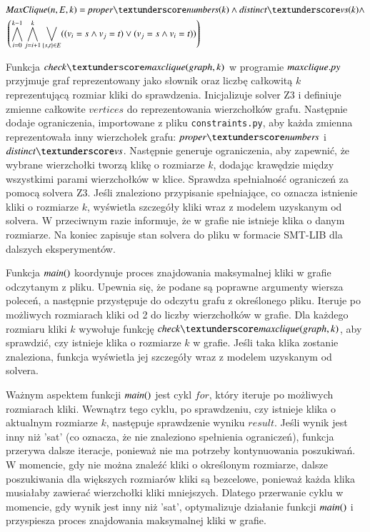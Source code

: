 \begin{align*}
	&\MaxClique(n, E, k) = \propernumbers(k)  \land \distinctvs(k)  \land \\
	&\left( \bigwedge_{i=0}^{k-1} \bigwedge_{j=i+1}^{k} \bigvee_{\{s,t\} \in E} ((v_i = s \land v_j = t) \lor (v_j = s \land v_i = t)) \right)	
\end{align*}

Funkcja $\checkclique$  w programie ${\mathit{maxclique.py}}$ przyjmuje graf reprezentowany jako słownik oraz liczbę całkowitą $k$ reprezentującą rozmiar kliki do sprawdzenia. Inicjalizuje solver Z3 i definiuje zmienne całkowite $vertices$ do reprezentowania wierzchołków grafu. Następnie dodaje ograniczenia, importowane z pliku \texttt{constraints.py}, aby każda zmienna reprezentowała inny wierzchołek grafu: $\propernumbers$ i $\distinctvs$. Następnie generuje ograniczenia, aby zapewnić, że wybrane wierzchołki tworzą klikę o rozmiarze $k$, dodając krawędzie między wszystkimi parami wierzchołków w klice. Sprawdza spełnialność ograniczeń za pomocą solvera Z3. Jeśli znaleziono przypisanie spełniające, co oznacza istnienie kliki o rozmiarze $k$, wyświetla szczegóły kliki wraz z modelem uzyskanym od solvera. W przeciwnym razie informuje, że w grafie nie istnieje klika o danym rozmiarze. Na koniec zapisuje stan solvera do pliku w formacie SMT-LIB dla dalszych eksperymentów.



Funkcja ${\mathit{main()}}$ koordynuje proces znajdowania maksymalnej kliki w grafie odczytanym z pliku. Upewnia się, że podane są poprawne argumenty wiersza poleceń, a następnie przystępuje do odczytu grafu z określonego pliku. Iteruje po możliwych rozmiarach kliki od 2 do liczby wierzchołków w grafie. Dla każdego rozmiaru kliki $k$ wywołuje funkcję $\checkclique$, aby sprawdzić, czy istnieje klika o rozmiarze $k$ w grafie. Jeśli taka klika zostanie znaleziona, funkcja wyświetla jej szczegóły wraz z modelem uzyskanym od solvera. 

Ważnym aspektem funkcji ${\mathit{main()}}$ jest cykl $for$, który iteruje po możliwych rozmiarach kliki. Wewnątrz tego cyklu, po sprawdzeniu, czy istnieje klika o aktualnym rozmiarze $k$, następuje sprawdzenie wyniku $result$. Jeśli wynik jest inny niż 'sat' (co oznacza, że nie znaleziono spełnienia ograniczeń), funkcja przerywa dalsze iteracje, ponieważ nie ma potrzeby kontynuowania poszukiwań. W momencie, gdy nie można znaleźć kliki o określonym rozmiarze, dalsze poszukiwania dla większych rozmiarów kliki są bezcelowe, ponieważ każda klika musiałaby zawierać wierzchołki kliki mniejszych. Dlatego przerwanie cyklu w momencie, gdy wynik jest inny niż 'sat', optymalizuje działanie funkcji ${\mathit{main()}}$ i przyspiesza proces znajdowania maksymalnej kliki w grafie.

